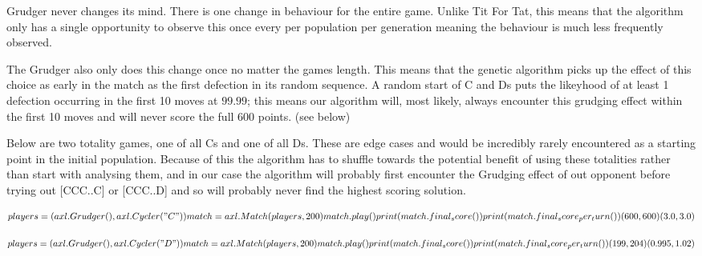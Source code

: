             \begin{itemize}
                \begin{item}
                    Grudger never changes its mind. There is one change in behaviour for the entire game. Unlike Tit For Tat, this means that the algorithm only has a single opportunity to observe this once every per population per generation meaning the behaviour is much less frequently observed.
                \end{item}
                
                \begin{item}
                    The Grudger also only does this change once no matter the games length. This means that the genetic algorithm picks up the effect of this choice as early in the match as the first defection in its random sequence. A random start of C and Ds puts the likeyhood of at least 1 defection occurring in the first 10 moves at \(99.99\); this means our algorithm will, most likely, always encounter this grudging effect within the first 10 moves and will never score the full 600 points. (see below)
                \end{item}
            \end{itemize}
            
            Below are two totality games, one of all Cs and one of all Ds. These are edge cases and would be incredibly rarely encountered as a starting point in the initial population. Because of this the algorithm has to shuffle towards the potential benefit of using these totalities rather than start with analysing them, and in our case the algorithm will probably first encounter the Grudging effect of out opponent before trying out [CCC..C] or [CCC..D] and so will probably never find the highest scoring solution.

            \[players = (axl.Grudger(),axl.Cycler("C"))
            match = axl.Match(players,200)
            match.play()
            print(match.final_score())
            print(match.final_score_per_turn())
            (600,600)
            (3.0,3.0)\]

            \[players = (axl.Grudger(),axl.Cycler("D"))
            match = axl.Match(players,200)
            match.play()
            print(match.final_score())
            print(match.final_score_per_turn())
            (199,204)
            (0.995,1.02)\]

